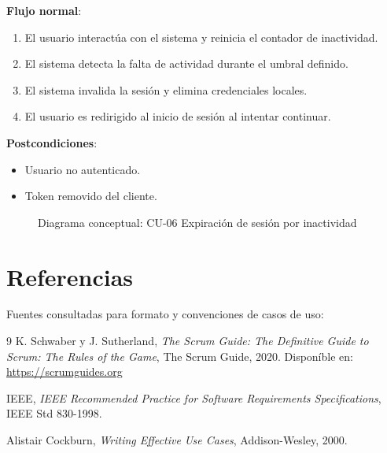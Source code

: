 \documentclass[12pt,a4paper]{article}
\begin{document}
\vspace{0.5em}

\textbf{Flujo normal}:
\begin{enumerate}[leftmargin=*]
    \item El usuario interact\'ua con el sistema y reinicia el contador de inactividad.
    \item El sistema detecta la falta de actividad durante el umbral definido.
    \item El sistema invalida la sesi\'on y elimina credenciales locales.
    \item El usuario es redirigido al inicio de sesi\'on al intentar continuar.
\end{enumerate}

\textbf{Postcondiciones}:
\begin{itemize}[leftmargin=*]
    \item Usuario no autenticado.
    \item Token removido del cliente.
\end{itemize}

\begin{figure}[h]
\centering
{}
\caption{Diagrama conceptual: CU-06 Expiraci\'on de sesi\'on por inactividad}
\end{figure}

\newpage
\section{Referencias}
Fuentes consultadas para formato y convenciones de casos de uso:
\begin{thebibliography}{9}
K. Schwaber y J. Sutherland,
\textit{The Scrum Guide: The Definitive Guide to Scrum: The Rules of the Game},
The Scrum Guide, 2020. Dispon\'ible en: \url{https://scrumguides.org}

IEEE,
\textit{IEEE Recommended Practice for Software Requirements Specifications},
IEEE Std 830-1998.

Alistair Cockburn,
\textit{Writing Effective Use Cases}, Addison-Wesley, 2000.
\end{thebibliography}
\end{document}
